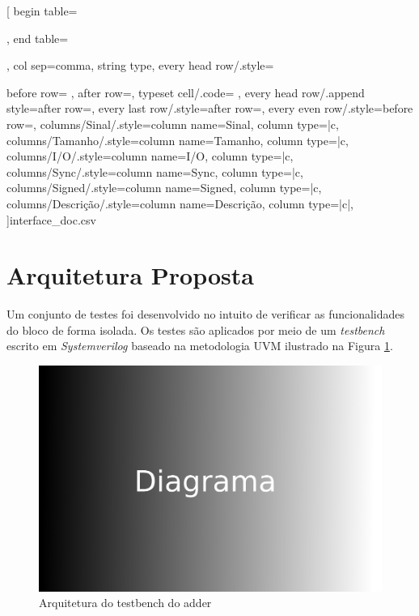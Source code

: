 \documentclass[a4paper]{article}
\begin{document}
\pgfplotstabletypeset[
    begin table=\begin{longtable},
    end table=\end{longtable},
    col sep=comma,
    string type,
    every head row/.style={
        before row={
        \hline
        },
        after row=\hline,
        typeset cell/.code={
    },
    every head row/.append style={after row=\endhea},
    every last row/.style={after row=\hline},
    every even row/.style={before row={}},
    columns/Sinal/.style={column name=Sinal, column type=|c},
    columns/Tamanho/.style={column name=Tamanho, column type=|c},
    columns/I/O/.style={column name=I/O, column type=|c},
    columns/Sync/.style={column name=Sync, column type=|c},
    columns/Signed/.style={column name=Signed, column type=|c},
    columns/Descrição/.style={column name=Descrição, column type=|c|},
    ]{interface_doc.csv}

\pagebreak

\section{Arquitetura Proposta}

Um conjunto de testes foi desenvolvido no intuito de verificar as funcionalidades do bloco de forma isolada. Os testes são aplicados por meio de um \textit{testbench} escrito em \textit{Systemverilog} baseado na metodologia UVM ilustrado na Figura \ref{diagrama}.

\begin{figure}[h]
    \centering
        \centering
        \includegraphics[width=\textwidth]{diagrama.png}
        \caption{Arquitetura do testbench do adder}
        \label{diagrama}
\end{figure}

}
\end{document}
